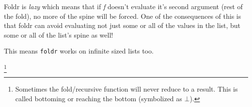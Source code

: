 Foldr is \emph{lazy} which means that if \emph{f} doesn't evaluate it's second argument (rest of the fold), no more of the spine will be forced. One of the consequences of this is that foldr can avoid evaluating not just some or all of the values in the list, but some or
all of the list’s spine as well!

This means \texttt{foldr} works on infinite sized lists too.

\footnote{Sometimes the fold/recursive function will never reduce to a result. This is called bottoming or reaching the bottom (symbolized as $\bot$).}
